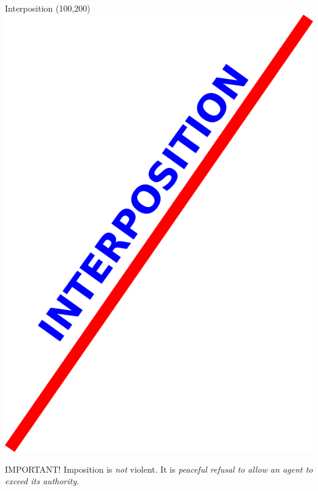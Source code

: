 \begin{frame}{Interposition}
    \Put(100,200){\includegraphics[height=0.8\textheight]{img/line.png}}
\end{frame}

\begin{frame}
    \begin{block}{IMPORTANT!}
        { \huge Imposition is \emph{not} violent. It is \emph{peaceful refusal to allow an agent to exceed its authority}.}
    \end{block}
\end{frame}


